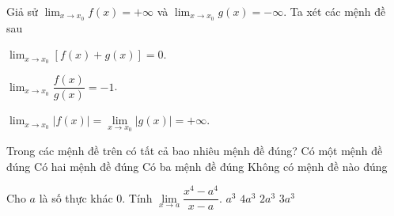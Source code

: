 \begin{ex}%
	Giả sử $\displaystyle \lim_{x \rightarrow x_0} f(x) = +\infty$ và $\displaystyle \lim_{x \rightarrow x_0} g(x) = -\infty$. Ta xét các mệnh đề sau
	\begin{enumEX}[(1)]{3}
		\item $\displaystyle \lim_{x \rightarrow x_0} \left[f(x) + g(x)\right]  = 0$.
		\item $\displaystyle \lim_{x \rightarrow x_0} \dfrac{f(x)}{g(x)}  = -1$.
		\item $\displaystyle \lim_{x \rightarrow x_0} \left|f(x)\right|  = \lim\limits_{x\rightarrow x_0} \left|g(x)\right| = +\infty$.
	\end{enumEX}
	Trong các mệnh đề trên có tất cả bao nhiêu mệnh đề đúng?
	\choice
	{Có một mệnh đề đúng}
	{Có hai mệnh đề đúng}
	{Có ba mệnh đề đúng}
	{\True Không có mệnh đề nào đúng}
\end{ex}


\begin{ex}%
	Cho $a$ là số thực khác $0$. Tính $\lim\limits_{ x\to a} \dfrac{x^4 -a^4}{x-a}$.
	\choice
	{$a^3$}
	{\True $4a^3$}
	{$2a^3$}
	{$3a^3$}
\end{ex}


